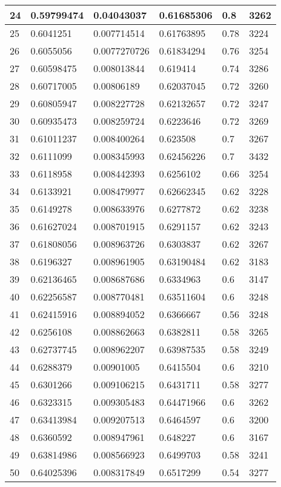 \begin{longtable}{|l|l|l|l|l|l|}
24 & 0.59799474 & 0.04043037 & 0.61685306 & 0.8 & 3262 \\ \hline 
25 & 0.6041251 & 0.007714514 & 0.61763895 & 0.78 & 3224 \\ \hline 
26 & 0.6055056 & 0.0077270726 & 0.61834294 & 0.76 & 3254 \\ \hline 
27 & 0.60598475 & 0.008013844 & 0.619414 & 0.74 & 3286 \\ \hline 
28 & 0.60717005 & 0.00806189 & 0.62037045 & 0.72 & 3260 \\ \hline 
29 & 0.60805947 & 0.008227728 & 0.62132657 & 0.72 & 3247 \\ \hline 
30 & 0.60935473 & 0.008259724 & 0.6223646 & 0.72 & 3269 \\ \hline 
31 & 0.61011237 & 0.008400264 & 0.623508 & 0.7 & 3267 \\ \hline 
32 & 0.6111099 & 0.008345993 & 0.62456226 & 0.7 & 3432 \\ \hline 
33 & 0.6118958 & 0.008442393 & 0.6256102 & 0.66 & 3254 \\ \hline 
34 & 0.6133921 & 0.008479977 & 0.62662345 & 0.62 & 3228 \\ \hline 
35 & 0.6149278 & 0.008633976 & 0.6277872 & 0.62 & 3238 \\ \hline 
36 & 0.61627024 & 0.008701915 & 0.6291157 & 0.62 & 3243 \\ \hline 
37 & 0.61808056 & 0.008963726 & 0.6303837 & 0.62 & 3267 \\ \hline 
38 & 0.6196327 & 0.008961905 & 0.63190484 & 0.62 & 3183 \\ \hline 
39 & 0.62136465 & 0.008687686 & 0.6334963 & 0.6 & 3147 \\ \hline 
40 & 0.62256587 & 0.008770481 & 0.63511604 & 0.6 & 3248 \\ \hline 
41 & 0.62415916 & 0.008894052 & 0.6366667 & 0.56 & 3248 \\ \hline 
42 & 0.6256108 & 0.008862663 & 0.6382811 & 0.58 & 3265 \\ \hline 
43 & 0.62737745 & 0.008962207 & 0.63987535 & 0.58 & 3249 \\ \hline 
44 & 0.6288379 & 0.00901005 & 0.6415504 & 0.6 & 3210 \\ \hline 
45 & 0.6301266 & 0.009106215 & 0.6431711 & 0.58 & 3277 \\ \hline 
46 & 0.6323315 & 0.009305483 & 0.64471966 & 0.6 & 3262 \\ \hline 
47 & 0.63413984 & 0.009207513 & 0.6464597 & 0.6 & 3200 \\ \hline 
48 & 0.6360592 & 0.008947961 & 0.648227 & 0.6 & 3167 \\ \hline 
49 & 0.63814986 & 0.008566923 & 0.6499703 & 0.58 & 3241 \\ \hline 
50 & 0.64025396 & 0.008317849 & 0.6517299 & 0.54 & 3277 \\ \hline 
\end{longtable}